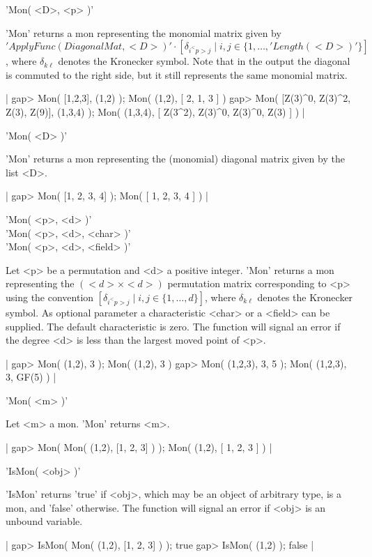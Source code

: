 'Mon( <D>, <p> )'

'Mon' returns a mon representing the monomial matrix given by 
$'ApplyFunc(DiagonalMat, <D> )'\cdot
[\delta_{i^<p>j}\mid i,j\in\{1,\dots,'Length( <D> )'\}]$,
where $\delta_{k\ell}$ denotes the Kronecker symbol.
Note that in the output the diagonal is commuted to the right side, 
but it still represents the same monomial matrix.

|    gap> Mon( [1,2,3], (1,2) );
    Mon(
      (1,2),
      [ 2, 1, 3 ]
    )
    gap> Mon( [Z(3)^0, Z(3)^2, Z(3), Z(9)], (1,3,4) ); 
    Mon(
      (1,3,4),
      [ Z(3^2), Z(3)^0, Z(3)^0, Z(3) ]
    ) |

'Mon( <D> )'

'Mon' returns a mon representing the (monomial) diagonal matrix
given by the list <D>.

|    gap> Mon( [1, 2, 3, 4] );
    Mon( [ 1, 2, 3, 4 ] ) |

'Mon( <p>, <d> )'\\
'Mon( <p>, <d>, <char> )'\\
'Mon( <p>, <d>, <field> )'

Let <p> be a permutation and <d> a positive integer. 'Mon'
returns a mon representing the $(<d>\times<d>)$ permutation matrix
corresponding to <p> using the convention 
$[\delta_{i^<p>j}\mid i,j\in\{1,\dots,d\}]$, where 
$\delta_{k\ell}$ denotes the Kronecker symbol. As optional parameter 
a characteristic <char> or a <field> can be supplied. 
The default characteristic is zero. The function will signal 
an error if the degree <d> is less than the largest moved point of <p>.

|    gap> Mon( (1,2), 3 );
    Mon( (1,2), 3 )
    gap> Mon( (1,2,3), 3, 5 );
    Mon( (1,2,3), 3, GF(5) ) |

'Mon( <m> )'

Let <m> a mon. 'Mon' returns <m>.

|    gap> Mon( Mon( (1,2), [1, 2, 3] ) );
    Mon(
      (1,2),
      [ 1, 2, 3 ]
    ) |

%

'IsMon( <obj> )'

'IsMon'  returns  'true' if  <obj>,  which may  be  an object of
arbitrary type, is a mon, and  'false' otherwise. The function
will signal an error if <obj> is an unbound variable.

|    gap> IsMon( Mon( (1,2), [1, 2, 3] ) );
    true
    gap> IsMon( (1,2) );
    false |

